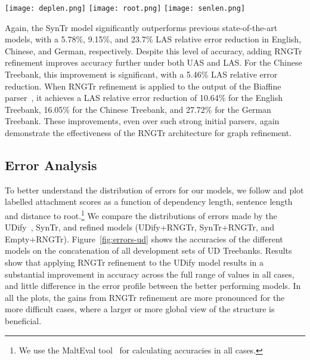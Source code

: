 \begin{figure*}[!ht]
  \centering
  \hspace{-2ex}
  \texttt{[image: deplen.png]}
  \texttt{[image: root.png]}
  \texttt{[image: senlen.png]}
  \hspace{-2ex}
  \caption{Error analysis, on the concatenation of UD Treebanks, of initial parsers (UDify and SynTr), their integration with the RNGTr model, and the Empty+RNGTr model.
    \vspace{-1ex}
  }
  \label{fig:errors-ud}
\end{figure*}

Again, the SynTr model significantly outperforms previous state-of-the-art models, with a 5.78\%, 9.15\%, and 23.7\% LAS relative error reduction in English, Chinese, and German, respectively.  Despite this level of accuracy, adding RNGTr refinement improves accuracy further under both UAS and LAS.  For the Chinese Treebank, this improvement is significant, with a 5.46\% LAS relative error reduction.
When RNGTr refinement is applied to the output of the Biaffine parser~\cite{dozat2016deep}, it achieves a LAS relative error reduction of 10.64\% for the English Treebank, 16.05\% for the Chinese Treebank, and 27.72\% for the German Treebank.
These improvements, even over such strong initial parsers, again demonstrate the effectiveness of the RNGTr architecture for graph refinement.

\subsection{Error Analysis}
\label{sec:error-an}

To better understand the distribution of errors for our models, we follow  and plot labelled attachment scores as a function of dependency length, sentence length and distance to root.\footnote{We use the MaltEval tool~\cite{nilsson-nivre-2008-malteval} for calculating accuracies in all cases.}
We compare the distributions of errors made by the UDify~\cite{Kondratyuk_2019}, SynTr, and refined models (UDify+RNGTr, SynTr+RNGTr, and Empty+RNGTr).  Figure~\ref{fig:errors-ud} shows the accuracies of the different models on the concatenation of all development sets of UD Treebanks.
Results show that applying RNGTr refinement to the UDify model results in a substantial improvement in accuracy across the full range of values in all cases,  
and little difference in the error profile between the better performing models.
In all the plots, the gains from RNGTr refinement are more pronounced for the more difficult cases, where a larger or more global view of the structure is beneficial.


